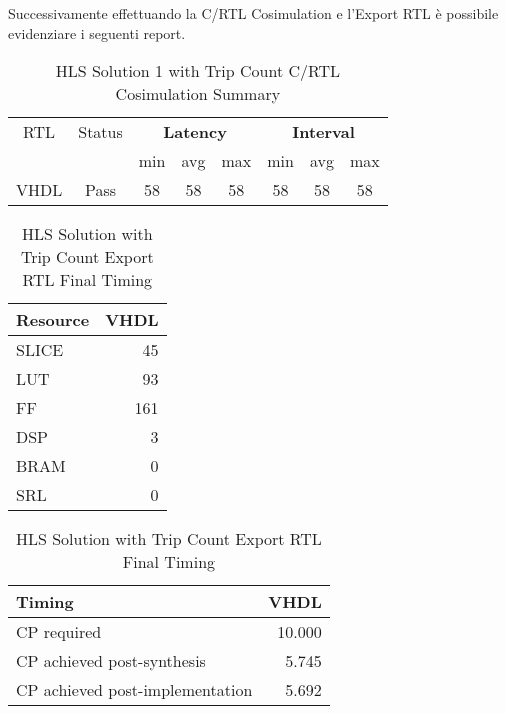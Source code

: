 Successivamente effettuando la C/RTL Cosimulation e l'Export RTL è possibile evidenziare i seguenti report.
\begin{table}[H]
	\centering
	\begin{tabular}{|c|c|c|c|c|c|c|c|}
		\hline
		\multicolumn{1}{|c|}{RTL} & \multicolumn{1}{|c|}{Status} & \multicolumn{3}{c|}{\textbf{Latency}} & \multicolumn{3}{c|}{\textbf{Interval}} \\
		&  & min & avg & max & min & avg & max \\
		\hline
		VHDL & Pass & 58 & 58 & 58 & 58 & 58 & 58 \\
		\hline
	\end{tabular}
	\caption{HLS Solution 1 with Trip Count C/RTL Cosimulation Summary }
	\label{tab:hls-solution-1-cosimulation-summary}
\end{table}

\begin{table}[H]
	\centering
	\begin{minipage}[t]{0.45\linewidth}
		\centering
		\begin{tabular}{|l|r|}
			\hline
			\textbf{Resource} & \textbf{VHDL} \\
			\hline
			SLICE & 45 \\
			\hline
			LUT & 93 \\
			\hline
			FF & 161 \\
			\hline
			DSP & 3 \\
			\hline
			BRAM & 0 \\
			\hline
			SRL & 0 \\
			\hline
		\end{tabular}
		\caption{HLS Solution 1 with Trip Count Export RTL Resource Usage}
		\label{tab:hls-solution-1-export-rtl-resoruce-usage}
	\end{minipage}
	\hfill
	\begin{minipage}[t]{0.45\linewidth}
		\centering
		\begin{tabular}{|l|r|}
			\hline
			\textbf{Timing} & \textbf{VHDL} \\
			\hline
			CP required & 10.000 \\
			\hline
			CP achieved post-synthesis & 5.745 \\
			\hline
			CP achieved post-implementation & 5.692 \\
			\hline
		\end{tabular}
		\caption{HLS Solution with Trip Count Export RTL Final Timing}
		\label{tab:hls-solution-1-export-rtl-final-timing}
	\end{minipage}
\end{table}